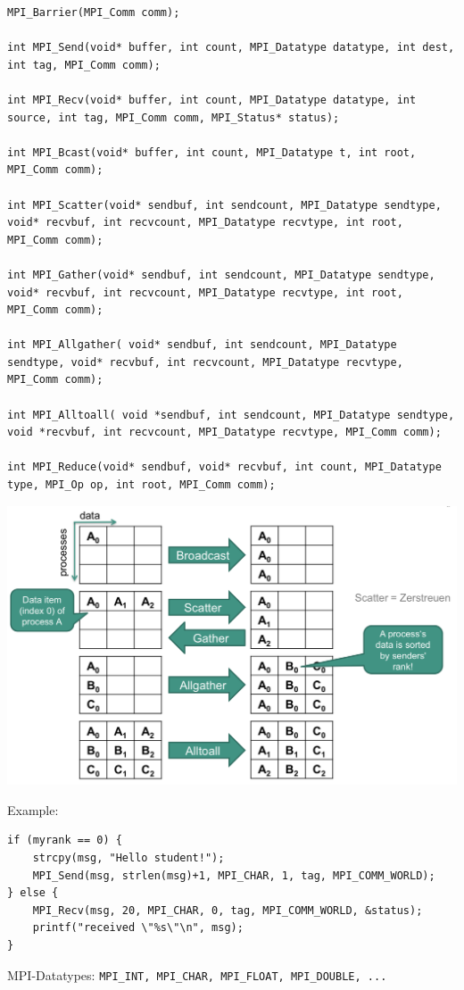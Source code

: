 \begin{verbatim}
MPI_Barrier(MPI_Comm comm);

int MPI_Send(void* buffer, int count, MPI_Datatype datatype, int dest, int tag, MPI_Comm comm);

int MPI_Recv(void* buffer, int count, MPI_Datatype datatype, int source, int tag, MPI_Comm comm, MPI_Status* status);

int MPI_Bcast(void* buffer, int count, MPI_Datatype t, int root, MPI_Comm comm);

int MPI_Scatter(void* sendbuf, int sendcount, MPI_Datatype sendtype, void* recvbuf, int recvcount, MPI_Datatype recvtype, int root, MPI_Comm comm);

int MPI_Gather(void* sendbuf, int sendcount, MPI_Datatype sendtype, void* recvbuf, int recvcount, MPI_Datatype recvtype, int root, MPI_Comm comm);

int MPI_Allgather( void* sendbuf, int sendcount, MPI_Datatype sendtype, void* recvbuf, int recvcount, MPI_Datatype recvtype, MPI_Comm comm);

int MPI_Alltoall( void *sendbuf, int sendcount, MPI_Datatype sendtype, void *recvbuf, int recvcount, MPI_Datatype recvtype, MPI_Comm comm);

int MPI_Reduce(void* sendbuf, void* recvbuf, int count, MPI_Datatype type, MPI_Op op, int root, MPI_Comm comm);
\end{verbatim}
\begin{center}
\includegraphics[width=\columnwidth]{images/MPI.png}
\end{center}
Example:
\begin{verbatim}
if (myrank == 0) {
    strcpy(msg, "Hello student!");
    MPI_Send(msg, strlen(msg)+1, MPI_CHAR, 1, tag, MPI_COMM_WORLD);
} else {
    MPI_Recv(msg, 20, MPI_CHAR, 0, tag, MPI_COMM_WORLD, &status); 
    printf("received \"%s\"\n", msg);
}
\end{verbatim}
MPI-Datatypes: \texttt{MPI\_INT, MPI\_CHAR, MPI\_FLOAT,  MPI\_DOUBLE, ...}\\

